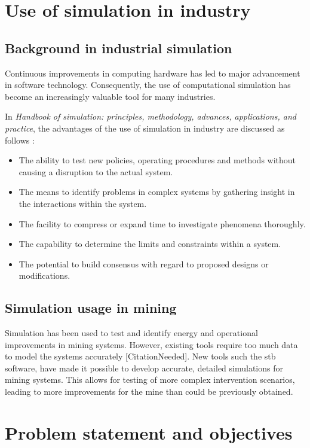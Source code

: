 	\section{Use of simulation in industry }
	\subsection{Background in industrial simulation}
		Continuous improvements in computing hardware has led to major advancement in software technology. Consequently, the use of computational simulation has become an increasingly valuable tool for many industries.\cite{kocsis2003integration} \par 
		In \textit{ Handbook of simulation: principles, methodology, advances, applications, and practice}, the advantages of the use of simulation in industry are discussed as follows \cite{banks1998handbook}: 
		\begin{itemize}
			\item The ability to test new policies, operating procedures and methods without causing a disruption to the actual system.
			\item The means to identify problems in complex systems by gathering insight in the interactions within the system.
			\item The facility to compress or expand time to investigate phenomena thoroughly.
			\item The capability to determine the limits and constraints within a system.
			\item The potential to build consensus with regard to proposed designs or modifications.
		\end{itemize}

	\subsection{Simulation usage in mining}
		Simulation has been used to test and identify energy and operational improvements in mining systems. However,  existing tools require too much data to model the systems accurately [CitationNeeded].  New tools such the \gls{stb} software, have made it possible to develop accurate, detailed simulations for mining systems. This allows for testing of more complex intervention scenarios, leading to more improvements for the mine than could be previously obtained.
		
	\section{Problem statement and objectives}
